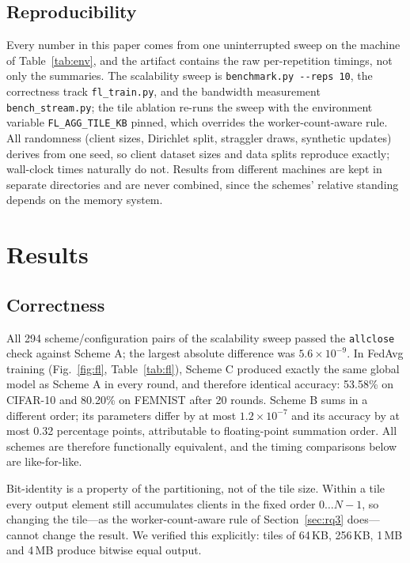 \documentclass[conference]{IEEEtran}
\begin{document}
\subsection{Reproducibility}
Every number in this paper comes from one uninterrupted sweep on the machine of Table~\ref{tab:env}, and the artifact contains the raw per-repetition timings, not only the summaries. The scalability sweep is \texttt{benchmark.py -{}-reps 10}, the correctness track \texttt{fl\_train.py}, and the bandwidth measurement \texttt{bench\_stream.py}; the tile ablation re-runs the sweep with the environment variable \texttt{FL\_AGG\_TILE\_KB} pinned, which overrides the worker-count-aware rule. All randomness (client sizes, Dirichlet split, straggler draws, synthetic updates) derives from one seed, so client dataset sizes and data splits reproduce exactly; wall-clock times naturally do not. Results from different machines are kept in separate directories and are never combined, since the schemes' relative standing depends on the memory system.

\section{Results}
\subsection{Correctness}
\label{sec:correctness}
All 294 scheme/configuration pairs of the scalability sweep passed the \texttt{allclose} check against Scheme A; the largest absolute difference was $5.6\times10^{-9}$. In FedAvg training (Fig.~\ref{fig:fl}, Table~\ref{tab:fl}), Scheme C produced exactly the same global model as Scheme A in every round, and therefore identical accuracy: 53.58\% on CIFAR-10 and 80.20\% on FEMNIST after 20 rounds. Scheme B sums in a different order; its parameters differ by at most $1.2\times10^{-7}$ and its accuracy by at most 0.32 percentage points, attributable to floating-point summation order. All schemes are therefore functionally equivalent, and the timing comparisons below are like-for-like.

Bit-identity is a property of the partitioning, not of the tile size. Within a tile every output element still accumulates clients in the fixed order $0\ldots N\!-\!1$, so changing the tile---as the worker-count-aware rule of Section~\ref{sec:rq3} does---cannot change the result. We verified this explicitly: tiles of 64\,KB, 256\,KB, 1\,MB and 4\,MB produce bitwise equal output.
\end{document}
